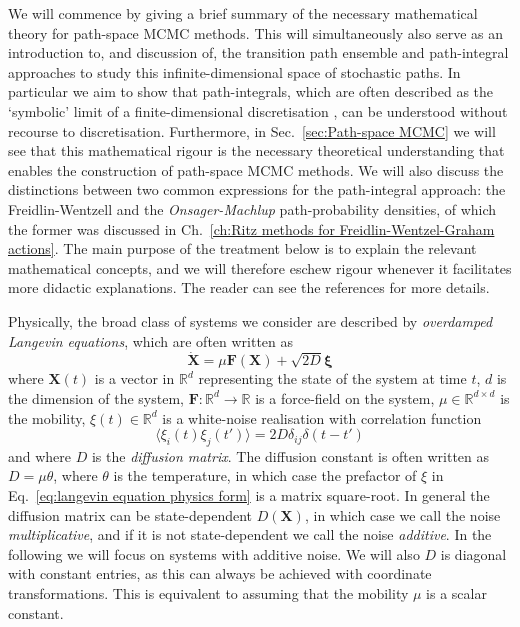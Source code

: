 We will commence by giving a brief summary of the necessary mathematical theory for path-space MCMC methods. This will simultaneously also serve as an introduction to, and discussion of, the transition path ensemble and path-integral approaches to study this infinite-dimensional space of stochastic paths. In particular we aim to show that path-integrals, which are often described as the `symbolic' limit of a finite-dimensional discretisation \citep{mossNoiseNonlinearDynamical1989, stratonovichMarkovMethodsTheory1989, moretteDefinitionApproximationFeynman1951}, can be understood without recourse to discretisation. Furthermore, in Sec.~\ref{sec:Path-space MCMC} we will see that this mathematical rigour is the necessary theoretical understanding that enables the construction of path-space MCMC methods. We will also discuss the distinctions between two common expressions for the path-integral approach: the Freidlin-Wentzell and the \textit{Onsager-Machlup} path-probability densities, of which the former was discussed in Ch.~\ref{ch:Ritz methods for Freidlin-Wentzel-Graham actions}. The main purpose of the treatment below is to explain the relevant mathematical concepts, and we will therefore eschew rigour whenever it facilitates more didactic explanations. The reader can see the references for more details.

Physically, the broad class of systems we consider are described by \textit{overdamped Langevin equations}, which are often written as \citep{kampenStochasticProcessesPhysics1992, riskenFokkerPlanckEquationMethods2012a}
\begin{equation} \label{eq:langevin equation physics form}
\dot{\mathbf{X}} = \mu \mathbf{F}(\mathbf{X}) + \sqrt{2D} \boldsymbol{\xi}
\end{equation}
where $\mathbf{X}(t)$ is a vector in $\mathbb{R}^d$ representing the state of the system at time $t$, $d$ is the dimension of the system, $\mathbf{F} : \mathbb{R}^d \to \mathbb{R}$ is a force-field on the system, $\mu \in \mathbb{R}^{d \times d}$ is the mobility, $\xi(t) \in \mathbb{R}^d$  is a white-noise realisation with correlation function
\begin{equation}
\langle \xi_i(t) \xi_j(t') \rangle = 2 D \delta_{ij} \delta(t - t')
\end{equation}
and where $D$ is the \textit{diffusion matrix}. The diffusion constant is often written as $D = \mu \theta$, where $\theta$ is the temperature, in which case the prefactor of $\xi$ in Eq.~\ref{eq:langevin equation physics form} is a matrix square-root. In general the diffusion matrix can be state-dependent $D(\mathbf{X})$, in which case we call the noise \textit{multiplicative}, and if it is not state-dependent we call the noise \textit{additive}. In the following we will focus on systems with additive noise. We will also $D$ is diagonal with constant entries, as this can always be achieved with coordinate transformations. This is equivalent to assuming that the mobility $\mu$ is a scalar constant.

